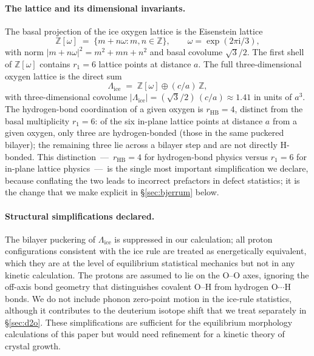 \documentclass[final]{siamltex}
\newcommand{\Z}{\mathbb{Z}}
\newcommand{\Eisenstein}{\mathbb{Z}[\omega]}
\newcommand{\IceLat}{\Lambda_{\mathrm{ice}}}
\begin{document}
\paragraph{The lattice and its dimensional invariants.}
The basal projection of the ice oxygen lattice is the Eisenstein
lattice
\begin{equation}
\Eisenstein \;=\; \{m + n\omega : m, n \in \Z\}, \qquad
\omega = \exp(2\pi\mathrm{i}/3),
\end{equation}
with norm $|m + n\omega|^2 = m^2 + mn + n^2$ and basal covolume
$\sqrt{3}/2$.  The first shell of $\Eisenstein$ contains
$r_1 = 6$ lattice points at distance $a$.  The full three-dimensional
oxygen lattice is the direct sum
\begin{equation}\label{eq:IceLat}
\IceLat \;=\; \Eisenstein \oplus (c/a)\,\Z,
\end{equation}
with three-dimensional covolume $|\IceLat| = (\sqrt{3}/2)\,(c/a)
\approx 1.41$ in units of $a^3$.  The hydrogen-bond coordination
of a given oxygen is $r_{\mathrm{HB}} = 4$, distinct from the
basal multiplicity $r_1 = 6$: of the six in-plane lattice points
at distance $a$ from a given oxygen, only three are
hydrogen-bonded (those in the same puckered bilayer); the
remaining three lie across a bilayer step and are not directly
H-bonded.  This distinction~---~$r_{\mathrm{HB}} = 4$ for
hydrogen-bond physics versus $r_1 = 6$ for in-plane lattice
physics~---~is the single most important simplification we
declare, because conflating the two leads to incorrect prefactors
in defect statistics; it is the change that we make explicit in
\S\ref{sec:bjerrum} below.

\paragraph{Structural simplifications declared.}
The bilayer puckering of $\IceLat$ is suppressed in our
calculation; all proton configurations consistent with the ice
rule are treated as energetically equivalent, which they are at
the level of equilibrium statistical mechanics but not in any
kinetic calculation.  The protons are assumed to lie on the O--O
axes, ignoring the off-axis bond geometry that distinguishes
covalent O--H from hydrogen O$\cdots$H bonds.  We do not include
phonon zero-point motion in the ice-rule statistics, although it
contributes to the deuterium isotope shift that we treat
separately in \S\ref{sec:d2o}.  These simplifications are
sufficient for the equilibrium morphology calculations of this
paper but would need refinement for a kinetic theory of
crystal growth.
\end{document}
